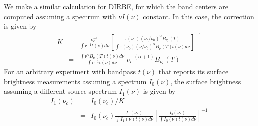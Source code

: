\documentclass[12pt,preprint]{aastex}
\begin{document}
We make a similar calculation for DIRBE, for which the band centers are 
computed assuming a spectrum with $\nu I(\nu)$ constant.  In this case, 
the correction is given by 
\begin{eqnarray}
K &=& \frac{\nu_c^{-1}}{\int \nu^{-1} t(\nu) d \nu} \left[\frac{\tau(\nu_0) (\nu_c / \nu_0)^\alpha B_{\nu_c}(T)}{\int \tau(\nu_0) (\nu / \nu_0)^\alpha B_{\nu}(T) t(\nu) d \nu} \right]^{-1} \\
\nonumber &=& \frac{\int \nu^\alpha B_{\nu}(T) t(\nu) d \nu}{\int \nu^{-1} t(\nu) d \nu} \; \nu_c^{-(\alpha+1)} B_{\nu_c}(T)
\end{eqnarray}
For an arbitrary experiment with bandpass $t(\nu)$ that reports its
surface brightness measurements assuming a spectrum $I_0(\nu)$, the
surface brightness assuming a different source spectrum $I_1(\nu)$ is
given by
\begin{eqnarray}
I_1(\nu_c) &=& I_0(\nu_c) / K \\
\nonumber &=& I_0(\nu_c) \frac{I_1(\nu_c)}{\int I_1(\nu) t(\nu) d \nu} \left[\frac{I_0(\nu_c)}{\int I_0(\nu) t(\nu) d \nu} \right]^{-1}
\end{eqnarray}


\end{document}
